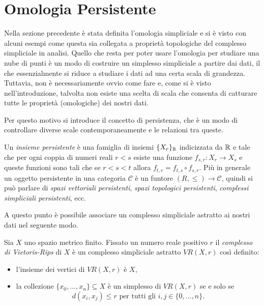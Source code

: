 \section{Omologia Persistente}\label{sec:persistenthomology}

Nella sezione precedente è stata definita l'omologia simpliciale e si è visto con alcuni esempi come questa sia collegata a proprietà topologiche del complesso simpliciale in analisi. Quello che resta per poter usare l'omologia per studiare una nube di punti è un modo di costruire un simplesso simpliciale a partire dai dati, il che essenzialmente si riduce a studiare i dati ad una certa scala di grandezza. Tuttavia, non è necessariamente ovvio come fare e, come si è visto nell'introduzione, talvolta non esiste una scelta di scala che consenta di catturare tutte le proprietà (omologiche) dei nostri dati.

Per questo motivo si introduce il concetto di persistenza, che è un modo di controllare diverse scale contemporaneamente e le relazioni tra queste.

\begin{defn}
  Un \emph{insieme persistente} è una famiglia di insiemi $\{X_r\}_{\mathbb{R}}$ indicizzata da $\mathbb{R}$ e tale che per ogni coppia di numeri reali $r<s$ esiste una funzione $f_{s,r}:X_r\to X_s$ e queste funzioni sono tali che se $r< s< t$ allora $f_{t,r} = f_{t,s}\circ f_{s,r}$. Più in generale un oggetto persistente in una categoria $\mathcal{C}$ è un funtore $(R,\leq)\to \mathcal{C}$, quindi si può parlare di \emph{spazi vettoriali persistenti},
  \emph{spazi topologici persistenti}, \emph{complessi simpliciali persistenti}, ecc.
\end{defn}

A questo punto è possibile associare un complesso simpliciale astratto ai nostri dati nel seguente modo.

\begin{defn}
  Sia $X$ uno spazio metrico finito. Fissato un numero reale positivo $r$ il \emph{complesso di Vietoris-Rips} di $X$ è
  un complesso simpliciale astratto $VR(X,r)$ così definito:
  \begin{itemize}
    \item l'insieme dei vertici di $VR(X,r)$ è $X$,
    \item la collezione $\{x_0,\dots,x_n\}\subseteq X$ è un simplesso di $VR(X,r)$ se e solo se
    \begin{equation*}
      d(x_i,x_j) \leq r \mathrm{\text{ per tutti gli }}i,j\in\{0,\dots,n\}.
    \end{equation*}
  \end{itemize}
\end{defn}

